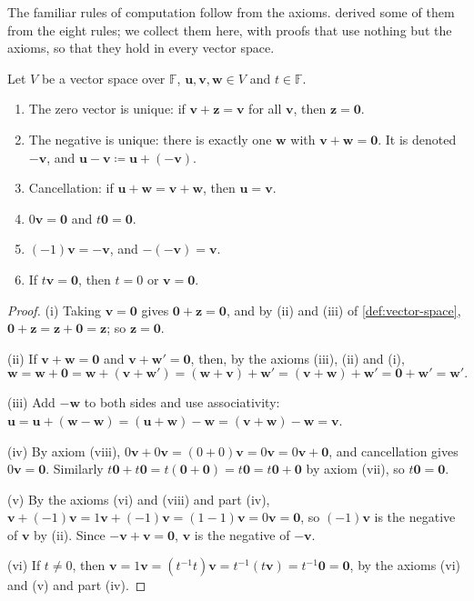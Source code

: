 The familiar rules of computation follow from the axioms.  derived some of them from the eight rules; we collect them here, with proofs that use nothing but the axioms, so that they hold in every vector space.

\begin{proposition}
\label{prop:vector-space-rules}
Let $V$ be a vector space over $\mathbb F$, $\mathbf u,\mathbf v,\mathbf w\in V$ and $t\in\mathbb F$.
\begin{enumerate}
\item The zero vector is unique: if $\mathbf v+\mathbf z=\mathbf v$ for all $\mathbf v$, then $\mathbf z=\mathbf 0$.
\item The negative is unique: there is exactly one $\mathbf w$ with $\mathbf v+\mathbf w=\mathbf 0$. It is denoted $-\mathbf v$, and $\mathbf u-\mathbf v\coloneqq\mathbf u+(-\mathbf v)$.
\item Cancellation: if $\mathbf u+\mathbf w=\mathbf v+\mathbf w$, then $\mathbf u=\mathbf v$.
\item $0\mathbf v=\mathbf 0$ and $t\mathbf 0=\mathbf 0$.
\item $(-1)\mathbf v=-\mathbf v$, and $-(-\mathbf v)=\mathbf v$.
\item If $t\mathbf v=\mathbf 0$, then $t=0$ or $\mathbf v=\mathbf 0$.
\end{enumerate}
\end{proposition}

\begin{proof}
(i) Taking $\mathbf v=\mathbf 0$ gives $\mathbf 0+\mathbf z=\mathbf 0$, and by (ii) and (iii) of \cref{def:vector-space}, $\mathbf 0+\mathbf z=\mathbf z+\mathbf 0=\mathbf z$; so $\mathbf z=\mathbf 0$.

(ii) If $\mathbf v+\mathbf w=\mathbf 0$ and $\mathbf v+\mathbf w'=\mathbf 0$, then, by the axioms (iii), (ii) and (i),
\[
\mathbf w=\mathbf w+\mathbf 0=\mathbf w+(\mathbf v+\mathbf w')=(\mathbf w+\mathbf v)+\mathbf w'=(\mathbf v+\mathbf w)+\mathbf w'=\mathbf 0+\mathbf w'=\mathbf w'.
\]

(iii) Add $-\mathbf w$ to both sides and use associativity: $\mathbf u=\mathbf u+(\mathbf w-\mathbf w)=(\mathbf u+\mathbf w)-\mathbf w=(\mathbf v+\mathbf w)-\mathbf w=\mathbf v$.

(iv) By axiom (viii), $0\mathbf v+0\mathbf v=(0+0)\mathbf v=0\mathbf v=0\mathbf v+\mathbf 0$, and cancellation gives $0\mathbf v=\mathbf 0$. Similarly $t\mathbf 0+t\mathbf 0=t(\mathbf 0+\mathbf 0)=t\mathbf 0=t\mathbf 0+\mathbf 0$ by axiom (vii), so $t\mathbf 0=\mathbf 0$.

(v) By the axioms (vi) and (viii) and part (iv), $\mathbf v+(-1)\mathbf v=1\mathbf v+(-1)\mathbf v=(1-1)\mathbf v=0\mathbf v=\mathbf 0$, so $(-1)\mathbf v$ is the negative of $\mathbf v$ by (ii). Since $-\mathbf v+\mathbf v=\mathbf 0$, $\mathbf v$ is the negative of $-\mathbf v$.

(vi) If $t\ne0$, then $\mathbf v=1\mathbf v=(t^{-1}t)\mathbf v=t^{-1}(t\mathbf v)=t^{-1}\mathbf 0=\mathbf 0$, by the axioms (vi) and (v) and part (iv).
\end{proof}

